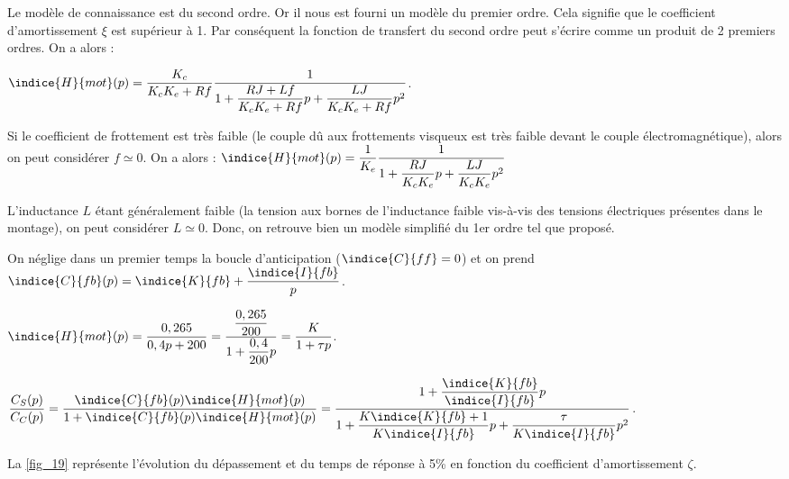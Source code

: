 \ifprof
\begin{corrige}
Le modèle de connaissance est du second ordre. Or il nous est fourni un modèle du premier ordre. Cela signifie que le coefficient d’amortissement $\xi$ est supérieur à 1. Par conséquent la fonction de transfert du second ordre peut s’écrire comme un produit de 2 premiers ordres.
On a alors :

$\indice{H}{mot} (p)=\dfrac{K_c}{K_c K_e+Rf}\dfrac{1}{1+\dfrac{RJ+Lf}{K_c K_e+Rf} p+\dfrac{LJ}{K_c K_e+Rf} p^2}$.
 
Si le coefficient de frottement est très faible (le couple dû aux frottements visqueux est très faible devant le couple électromagnétique), alors on peut considérer $f \simeq 0$.
On a alors :
$\indice{H}{mot} (p)=\dfrac{1}{K_e} \dfrac{1}{1+\dfrac{RJ}{K_c K_e} p+\dfrac{LJ}{K_c K_e} p^2}$

L’inductance $L$ étant généralement faible (la tension aux bornes de l’inductance faible vis-à-vis des tensions électriques présentes dans le montage), on peut considérer $L \simeq 0$.
Donc, on retrouve bien un modèle simplifié du 1er ordre tel que proposé.
 

\end{corrige}
\else
\fi

On néglige dans un premier temps la boucle d'anticipation ($\indice{C}{ff} =0$) et on prend
$\indice{C}{fb}( p)=\indice{K}{fb}+\dfrac{\indice{I}{fb}}{p}$.

\ifprof
\begin{corrige}
$\indice{H}{mot} (p)=\dfrac{0,265}{0,4p+200}=\dfrac{\dfrac{0,265}{200}}{1+\dfrac{0,4}{200} p}=\dfrac{K}{1+\tau p}$.

$\dfrac{C_S (p)}{C_C (p)} = \dfrac{\indice{C}{fb} (p) \indice{H}{mot} (p)}{1+\indice{C}{fb} (p) \indice{H}{mot} (p) }=\dfrac{1+\dfrac{\indice{K}{fb}}{\indice{I}{fb}}  p}{1+\dfrac{K\indice{K}{fb}+1}{K\indice{I}{fb}} p+\dfrac{\tau}{K\indice{I}{fb}} p^2}$.
\end{corrige}
\else
\fi

La \autoref{fig_19} représente l'évolution du dépassement et du temps de réponse à 5\% en fonction du
coefficient d'amortissement $\zeta$.

